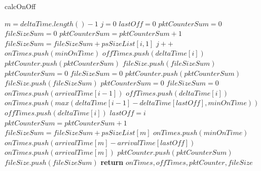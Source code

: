     
\begin{algorithm}[ht!]
    \caption{calcOnOff}
    \label{alg:calcOnOff}
    \begin{algorithmic}[1]
        \small
        \State $m = deltaTime.length() - 1$
        \State $j = 0$
        \State $lastOff = 0$
        \State $pktCounterSum = 0$
        \State $fileSizeSum = 0$
        \State $pktCounterSum = pktCounterSum + 1$
        \State $fileSizeSum = fileSizeSum + psSizeList[i, 1]$
         
        \State $j++$
        \State $onTimes.push(minOnTime)$
        \State $offTimes.push(deltaTime[i])$
        \State $pktCounter.push(pktCounterSum)$
        \State $fileSize.push(fileSizeSum)$
        \State $pktCounterSum = 0$
        \State $fileSizeSum = 0$
        \Else {} 
        \State $pktCounter.push(pktCounterSum)$
        \State $fileSize.push(fileSizeSum)$
        \State $pktCounterSum = 0$
        \State $fileSizeSum = 0$
        \State $onTimes.push(arrivalTime[i - 1])$
        \State $offTimes.push(deltaTime[i])$
        \Else {} 
        \State  $onTimes.push(max(deltaTime[i-1] - deltaTime[lastOff], minOnTime))$ 
        \State  $offTimes.push(deltaTime[i])$
        \EndIf
        \State $lastOff = i$
        \EndIf 
        \EndIf       
        \EndFor
        \State $pktCounterSum = pktCounterSum + 1$
        \State $fileSizeSum = fileSizeSum + psSizeList[m]$
         
        \State $onTimes.push(minOnTime)$ %
        \Else {}
        \State $onTimes.push(arrivalTime[m] - arrivalTime[lastOff])$ 
        \Else 
        \State $onTimes.push(arrivalTime[m])$ 
        \EndIf
        \EndIf
        \State $pktCounter.push(pktCounterSum)$
        \State $fileSize.push(fileSizeSum)$
        \State \textbf{return} $onTimes, offTimes, pktCounter, fileSize$
        \EndFunction
    \end{algorithmic}
\end{algorithm}
    
